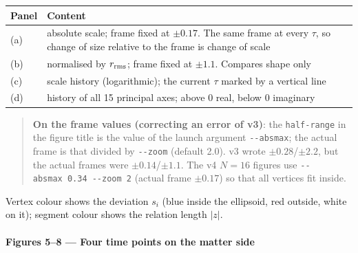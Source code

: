 \documentclass[
  10pt,
]{article}
\newcounter{none} %
\begin{document}
{\def\LTcaptype{none} %
\begin{longtable}[]{@{}
  >{\raggedright\arraybackslash}p{}
  >{\raggedright\arraybackslash}p{}@{}}
\toprule\noalign{}
\begin{minipage}[b]{\linewidth}\raggedright
Panel
\end{minipage} & \begin{minipage}[b]{\linewidth}\raggedright
Content
\end{minipage} \\
\midrule\noalign{}
\endhead
\bottomrule\noalign{}
\endlastfoot
(a) & absolute scale; frame fixed at \(\pm0.17\). The same frame at
every \(\tau\), so change of size relative to the frame is change of
scale \\
(b) & normalised by \(r_{\rm rms}\); frame fixed at \(\pm1.1\). Compares
shape only \\
(c) & scale history (logarithmic); the current \(\tau\) marked by a
vertical line \\
(d) & history of all 15 principal axes; above \(0\) real, below \(0\)
imaginary \\
\end{longtable}
}

\begin{quote}
\textbf{On the frame values (correcting an error of v3)}: the
\texttt{half-range} in the figure title is the value of the launch
argument \texttt{-\/-absmax}; the actual frame is that divided by
\texttt{-\/-zoom} (default 2.0). v3 wrote \(\pm0.28\)/\(\pm2.2\), but
the actual frames were \(\pm0.14\)/\(\pm1.1\). The v4 \(N=16\) figures
use \texttt{-\/-absmax\ 0.34\ -\/-zoom\ 2} (actual frame \(\pm0.17\)) so
that all vertices fit inside.
\end{quote}

Vertex colour shows the deviation \(s_i\) (blue inside the ellipsoid,
red outside, white on it); segment colour shows the relation length
\(|z|\).

\paragraph{Figures 5--8 --- Four time points on the matter
side}\label{figures-58-four-time-points-on-the-matter-side}
\end{document}
